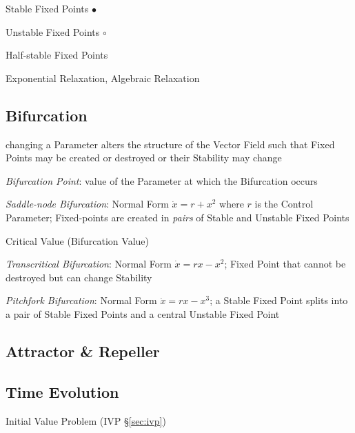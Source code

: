 Stable Fixed Points $\bullet$

Unstable Fixed Points $\circ$

Half-stable Fixed Points

Exponential Relaxation, Algebraic Relaxation



\subsection{Bifurcation}\label{sec:bifurcation}

changing a Parameter alters the structure of the Vector Field such that Fixed
Points may be created or destroyed or their Stability may change

\emph{Bifurcation Point}: value of the Parameter at which the Bifurcation
occurs

\emph{Saddle-node Bifurcation}: Normal Form $\dot{x} = r + x^2$ where $r$ is
the Control Parameter;
Fixed-points are created in \emph{pairs} of Stable and Unstable Fixed Points


Critical Value (Bifurcation Value)

\emph{Transcritical Bifurcation}: Normal Form $\dot{x} = rx - x^2$; Fixed Point
that cannot be destroyed but can change Stability

\emph{Pitchfork Bifurcation}: Normal Form $\dot{x} = rx - x^3$; a Stable Fixed
Point splits into a pair of Stable Fixed Points and a central Unstable Fixed
Point



\subsection{Attractor \& Repeller}\label{sec:attractor_repeller}

\subsection{Time Evolution}\label{sec:time_evolution}

\fist Initial Value Problem (IVP \S\ref{sec:ivp})

